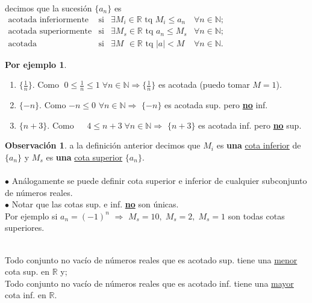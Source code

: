 \documentclass{article}
\theoremstyle{definition}
\newtheorem*{obs}{Observación}
\newtheorem*{ej}{Por ejemplo}
\theoremstyle{remark}
\begin{document}
\pagebreak
\begin{defi}
  decimos que la sucesión $\{a_n\}$ es \\
  $\begin{array}{clll} 
    \text{acotada inferiormente} & \text{si} & \exists M_i \in \mathbb{R} \text{ tq } M_i \leq a_n  &  \forall n \in \mathbb{N} ;  \\ 
    \text{acotada superiormente} & \text{si} & \exists M_s \in \mathbb{R} \text{ tq } a_n \leq M_s & \forall n \in \mathbb{N};  \\
    \text{acotada} & \text{si} & \exists M_{\phantom{s}}\in\mathbb{R} \text{ tq } |a|<M & \forall n \in \mathbb{N}. 
  \end{array}$
\end{defi}
\begin{ej} \; \\
  \begin{enumerate}
    \item $\{\frac{1}{n}\}$.\;\;\;\; Como $\phantom{.}0\leq \frac{1}{n} \leq 1 \; \forall n\in \mathbb{N} \Rightarrow $$\{\frac{1}{n}\}$ es acotada (puedo tomar $M=1$).
  \item $\{-n\}$. \;   Como $-n \leq 0$ \;\;\;\;\; $\forall n \in \mathbb{N} \Rightarrow $ $\{-n\}$ \; \; es acotada sup. pero \textbf{\underline{no}} inf. 
  \item $\{n+3\}$. Como $\phantom{-}4 \leq n+3 \; \forall n \in \mathbb{N} \Rightarrow$ $\{n+3\}$ es acotada inf. pero \textbf{\underline{no}} sup.

  \end{enumerate}
\end{ej}

\begin{obs}
  a la definición anterior decimos que $M_i$ es \textbf{una }\underline{cota inferior} de $\{a_n\}$ y $M_s$ es \textbf{una} \underline{cota superior} $\{a_n\}$. \\ \\
$\bullet$ Análogamente se puede definir cota superior e inferior de cualquier subconjunto de números reales. \\
$\bullet$ Notar que las cotas sup. e inf. \textbf{\underline{no}} son únicas. \\
Por ejemplo si $a_n=(-1)^n$ $\Rightarrow$ $M_s=10,\;$$M_s=2,\;$$M_s=1$ son todas cotas superiores.
\end{obs}

\begin{axi} \; \\
  Todo conjunto no vacío de números reales que es acotado sup. tiene una \underline{menor} cota sup. en $\mathbb{R}$ y; \\
  Todo conjunto no vacío de números reales que es acotado inf. tiene una \underline{mayor} cota inf. en $\mathbb{R}$.
\end{axi}
\end{document}
